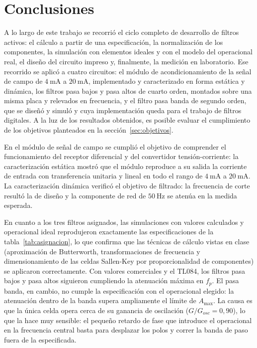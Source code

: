 \chapter{Conclusiones}
\label{chap:conclusiones}

A lo largo de este trabajo se recorrió el ciclo completo de desarrollo de filtros activos: el cálculo a partir de
una especificación, la normalización de los componentes, la simulación con elementos ideales y con el modelo del
operacional real, el diseño del circuito impreso y, finalmente, la medición en laboratorio. Ese recorrido se aplicó a
cuatro circuitos: el módulo de acondicionamiento de la señal de campo de $\SI{4}{\milli\ampere}$ a
$\SI{20}{\milli\ampere}$, implementado y caracterizado en forma estática y dinámica, los filtros pasa bajos y pasa
altos de cuarto orden, montados sobre una misma placa y relevados en frecuencia, y el filtro pasa banda de segundo
orden, que se diseñó y simuló y cuya implementación queda para el trabajo de filtros digitales. A la luz de los
resultados obtenidos, es posible evaluar el cumplimiento de los objetivos planteados en la
sección~\ref{sec:objetivos}.

En el módulo de señal de campo se cumplió el objetivo de comprender el funcionamiento del receptor diferencial y del
convertidor tensión-corriente: la caracterización estática mostró que el módulo reproduce a su salida la corriente de
entrada con transferencia unitaria y lineal en todo el rango de $\SI{4}{\milli\ampere}$ a $\SI{20}{\milli\ampere}$.
La caracterización dinámica verificó el objetivo de filtrado: la frecuencia de corte resultó la de diseño y la
componente de red de $\SI{50}{\hertz}$ se atenúa en la medida esperada.

En cuanto a los tres filtros asignados, las simulaciones con valores calculados y operacional ideal reprodujeron
exactamente las especificaciones de la tabla~\ref{tab:asignacion}, lo que confirma que las técnicas de cálculo vistas
en clase (aproximación de Butterworth, transformaciones de frecuencia y dimensionamiento de las celdas Sallen-Key por
proporcionalidad de componentes) se aplicaron correctamente. Con valores comerciales y el TL084, los filtros pasa
bajos y pasa altos siguieron cumpliendo la atenuación máxima en $f_p$. El pasa banda, en cambio, no cumple la
especificación con el operacional elegido: la atenuación dentro de la banda supera ampliamente el límite de
$A_{\max}$. La causa es que la única celda opera cerca de su ganancia de oscilación
($G / G_{osc} = 0{,}90$), lo que la hace muy sensible: el pequeño retardo de fase que introduce el operacional en la
frecuencia central basta para desplazar los polos y correr la banda de paso fuera de la especificada.

